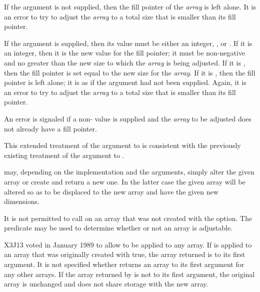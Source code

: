 \begin{defun}[Function]
\begin{new}
If the  argument is not supplied, then the fill pointer
of the \emph{array} is left alone.  It is an error
to try to adjust the \emph{array} to a total size that is smaller
than its fill pointer.

If the  argument is supplied, then its value
must be either an integer, \true, or \false.  If it is an integer,
then it is the new value for the fill pointer;
it must be non-negative and no greater than the new size to which the
\emph{array} is being adjusted.
If it is \true, then the fill pointer is set equal to the new size
for the \emph{array}.  If it is \false, then the fill pointer is
left alone; it is as if the argument had not been supplied.
Again, it is an error
to try to adjust the \emph{array} to a total size that is smaller
than its fill pointer.

An error is signaled if a non-{\false}  value
is supplied and the \emph{array} to be adjusted does not already
have a fill pointer.

This extended treatment of the 
argument to  is consistent with the previously
existing treatment of the  argument to .
\end{new}

 may, depending on the implementation and the arguments,
simply alter the given array or create and return a new one.
In the latter case the given array will be altered so as to be displaced
to the new array and have the given new dimensions.

\begin{obsolete}
It is not permitted to call  on an array that was not
created with the  option.  The predicate
 may be used to determine whether or not
an array is adjustable.
\end{obsolete}

\begin{newer}
X3J13 voted in January 1989
to allow  to be applied to any array.
If  is applied to an array that was
originally created with  true,
the array returned is  to its first argument.  It is not specified
whether  returns an array  to its first argument for any
other arrays.  If the array returned by  is not  to its
first argument, the original array is unchanged and does not share
storage with the new array.


\end{newer}
\end{defun}
